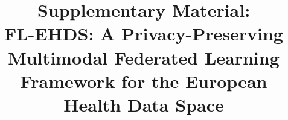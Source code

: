 \documentclass[conference]{IEEEtran}
\begin{document}
\renewcommand{\thetable}{S-\Roman{table}}
\renewcommand{\thefigure}{S-\arabic{figure}}

\title{Supplementary Material:\\FL-EHDS: A Privacy-Preserving Multimodal Federated Learning Framework for the European Health Data Space}

\author{
}

\maketitle
\end{document}
